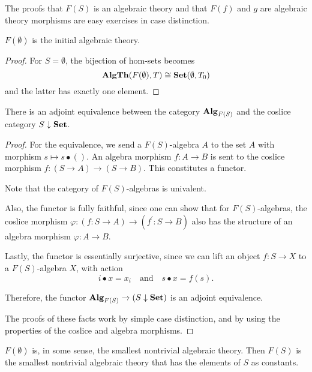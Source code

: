 The proofs that $ F(S) $ is an algebraic theory and that $ F(f) $ and $ g $ are algebraic theory morphisms are easy exercises in case distinction.

\begin{corollary}
  $ F(\emptyset) $ is the initial algebraic theory.
\end{corollary}
\begin{proof}
  For $ S = \emptyset $, the bijection of hom-sets becomes
  \[ \mathbf{AlgTh}(F(\emptyset), T) \cong \mathbf{Set}(\emptyset, T_0) \]
  and the latter has exactly one element.
\end{proof}

\begin{lemma}
  There is an adjoint equivalence between the category $ \mathbf{Alg}_{F(S)} $ and the coslice category $ S \downarrow \mathbf{Set} $.
\end{lemma}
\begin{proof}
  For the equivalence, we send a $ F(S) $-algebra $ A $ to the set $ A $ with morphism $ s \mapsto s \bullet () $. An algebra morphism $ f: A \to B $ is sent to the coslice morphism $ f: (S \to A) \to (S \to B) $. This constitutes a functor.

  Note that the category of $ F(S) $-algebras is univalent.

  Also, the functor is fully faithful, since one can show that for $ F(S) $-algebras, the coslice morphism $ \varphi: (f: S \to A) \to (f^\prime: S \to B) $ also has the structure of an algebra morphism $ \varphi: A \to B $.

  Lastly, the functor is essentially surjective, since we can lift an object $ f: S \to X $ to a $ F(S) $-algebra $ X $, with action
  \[ i \bullet x = x_i \quad \text{and} \quad s \bullet x = f(s). \]

  Therefore, the functor $ \mathbf{Alg}_{F(S)} \to (S \downarrow \mathbf{Set}) $ is an adjoint equivalence.

  The proofs of these facts work by simple case distinction, and by using the properties of the coslice and algebra morphisms.
\end{proof}

\begin{remark}
  $ F(\emptyset) $ is, in some sense, the smallest nontrivial algebraic theory. Then $ F(S) $ is the smallest nontrivial algebraic theory that has the elements of $ S $ as constants.
\end{remark}

